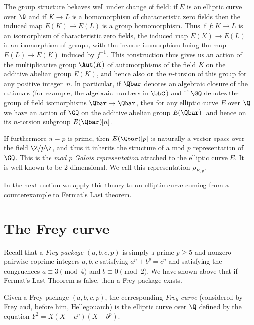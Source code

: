 The group structure behaves well under change of field: if $E$ is an elliptic curve over $\Q$
and if $K\to L$ is a homomorphism of
characteristic zero fields then the induced map $E(K)\to E(L)$ is a group homomorphism.
Thus if $f:K\to L$ is an isomorphism of characteristic zero fields, the induced map $E(K)\to E(L)$
is an isomorphism of groups, with the inverse isomorphism being the map $E(L)\to E(K)$ induced
by $f^{-1}$. This construction thus gives us an action of the multiplicative group $\Aut(K)$
of automorphisms of the field $K$ on the additive abelian group $E(K)$, and hence also
on the $n$-torsion of this group for any positive integer~$n$.
In particular, if $\Qbar$ denotes an algebraic closure of the
rationals (for example, the algebraic numbers in $\bbC$) and if $\GQ$ denotes the group of field
isomorphisms $\Qbar\to\Qbar$, then for any elliptic curve $E$ over $\Q$ we have an action
of $\GQ$ on the additive abelian group $E(\Qbar)$, and hence on its $n$-torsion subgroup
$E(\Qbar)[n]$.

If furthermore $n=p$ is prime, then $E(\Qbar)[p]$ is naturally a vector space over the
field $\Z/p\Z$, and thus it inherits the structure of a mod $p$ representation of $\GQ$.
This is the \emph{mod $p$ Galois representation} attached to the elliptic curve $E$.
It is well-known to be 2-dimensional. We call this representation $\rho_{E,p}$.

In the next section we apply this theory to an elliptic curve coming from a counterexample to
Fermat's Last theorem.

\section{The Frey curve}

Recall that a \emph{Frey package} $(a,b,c,p)$ is simply a prime $p\geq5$ and nonzero
pairwise-coprime integers $a,b,c$ satisfying $a^p+b^p=c^p$ and satisfying the congruences
$a\equiv3\pmod4$ and $b\equiv0\pmod2$. We have shown above that if Fermat's Last Theorem is false,
then a Frey package exists.

\begin{definition}[Frey]
  \label{FLT.FreyCurve}
  \leanok
  Given a Frey package $(a,b,c,p)$, the corresponding \emph{Frey curve} (considered by Frey and,
  before him, Hellegouarch) is the elliptic curve over $\Q$ defined by the equation
  $Y^2=X(X-a^p)(X+b^p).$
\end{definition}


